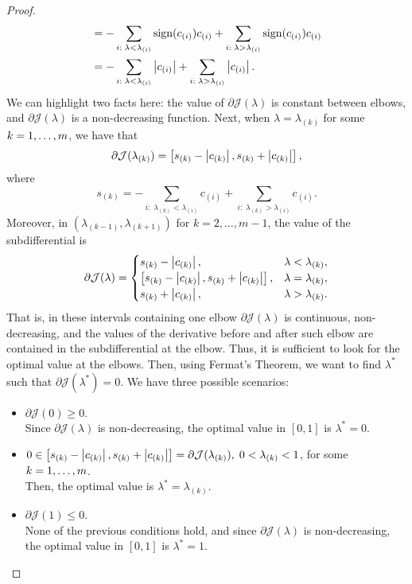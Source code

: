 \begin{proof}
\begin{equation}
\begin{aligned}
            &= - \sum_{i: \; \lambda < \lambda_{(i)}} \operatorname{sign}(c_{(i)}) {c_{(i)}} + \sum_{i: \; \lambda > \lambda_{(i)}} \operatorname{sign}(c_{(i)}) {c_{(i)}} \\
            &= - \sum_{i: \; \lambda < \lambda_{(i)}} \left|c_{(i)}\right| + \sum_{i: \; \lambda > \lambda_{(i)}} \left|c_{(i)}\right| .
        \end{aligned}        
    \end{equation}
    We can highlight two facts here: the value of $\partial \mathcal{J}(\lambda)$ is constant between elbows, and $\partial \mathcal{J}(\lambda)$ is a non-decreasing function.
    Next, when $\lambda = \lambda_{(k)}$ for some $k=1, \ldots, m$, we have that
    \begin{equation}
        \nonumber
        \partial \mathcal{J}(\lambda_{(k)}) = \left[ s_{(k)} - \left|c_{(k)}\right|, s_{(k)} + \left|c_{(k)}\right|   \right] ,
    \end{equation}
    where $$s_{(k)} = - \sum_{i: \; \lambda_{(k)} < \lambda_{(i)}} c_{(i)} + \sum_{i: \; \lambda_{(k)} > \lambda_{(i)}} c_{(i)}.$$
    Moreover, in $(\lambda_{(k-1)}, \lambda_{(k+1)})$ for $k=2, \ldots, m-1$, the value of the subdifferential is
    \begin{equation}
        \nonumber
        \partial \mathcal{J}(\lambda) = \begin{cases}
            s_{(k)} - \left|c_{(k)}\right|,& \lambda < \lambda_{(k)}, \\
            \left[ s_{(k)} - \left|c_{(k)}\right|, s_{(k)} + \left|c_{(k)}\right|   \right],& \lambda = \lambda_{(k)}, \\
            s_{(k)} + \left|c_{(k)}\right|,& \lambda > \lambda_{(k)} .
        \end{cases}
    \end{equation}
    That is, in these intervals containing one elbow  $\partial \mathcal{J}(\lambda)$ is continuous, non-decreasing, and the values of the derivative before and after such elbow are contained in the subdifferential at the elbow. Thus, it is sufficient to look for the optimal value at the elbows.
    Then, using Fermat's Theorem, we want to find $\lambda^*$ such that $\partial \mathcal{J}(\lambda^*) = 0$. We have three possible scenarios:
    \begin{itemize}
        \item $\partial \mathcal{J}(0) \geq 0.$ 
        \\Since $\partial \mathcal{J}(\lambda)$ is non-decreasing, the optimal value in $[0, 1]$ is $\lambda^* = 0$.
        \item $0 \in \left[ s_{(k)} - \left|c_{(k)}\right|, s_{(k)} + \left|c_{(k)}\right|   \right] = \partial \mathcal{J}(\lambda_{(k)}), \; 0 < \lambda_{(k)} < 1$, for some $k=1, \ldots, m$. 
        \\Then, the optimal value is $\lambda^*=\lambda_{(k)}$.
        \item $\partial \mathcal{J}(1) \leq 0$. 
        \\None of the previous conditions hold, and since $\partial \mathcal{J}(\lambda)$ is non-decreasing, the optimal value in $[0, 1]$ is $\lambda^* = 1$.
    \end{itemize}
\end{proof}
